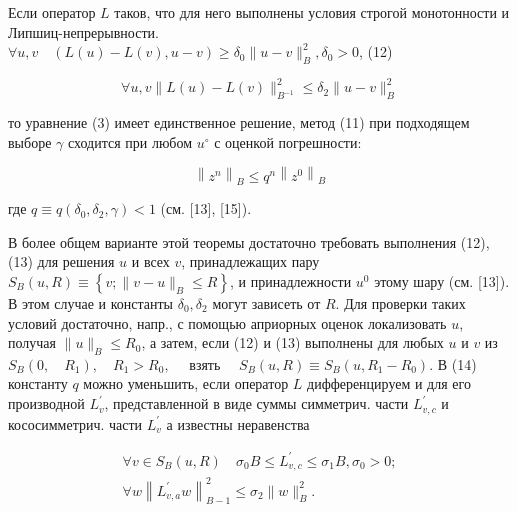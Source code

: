 \documentclass[10pt]{article}
\begin{document}
Если оператор $L$ таков, что для него выполнены условия строгой монотонности и Липшиц-непрерывности. $\forall u, v \quad(L(u)-L(v), u-v) \geqslant \delta_{0}\|u-v\|_{B}^{2}, \delta_{0}>0$, (12)



\[

\forall u, v\|L(u)-L(v)\|_{B^{-1}}^{2} \leqslant \delta_{2}\|u-v\|_{B}^{2}

\]



то уравнение (3) имеет единственное решение, метод (11) при подходящем выборе $\gamma$ сходится при любом $u^{\circ}$ с оценкой погрешности:



\[

\left\|z^{n}\right\|_{B} \leqslant q^{n}\left\|z^{0}\right\|_{B}

\]



где $q \equiv q\left(\delta_{0}, \delta_{2}, \gamma\right)<1$ (см. [13], [15]).



В более общем варианте этой теоремы достаточно требовать выполнения (12), (13) для решения $u$ и всех $v$, принадлежащих пару $S_{B}(u, R) \equiv\left\{v ;\|v-u\|_{B} \leqslant R\right\}$, и принадлежности $u^{0}$ этому шару (см. [13]). В этом случае и константы $\delta_{0}, \delta_{2}$ могут зависеть от $R$. Для проверки таких условий достаточно, напр., с помощью априорных оценок локализовать $u$, получая $\|u\|_{B} \leqslant R_{0}$, а затем, если (12) и (13) выполнены для любых $u$ и $v$ из $S_{B}\left(0, \quad R_{1}\right), \quad R_{1}>R_{0}, \quad$ взять $\quad S_{B}(u, R) \equiv S_{B}\left(u, R_{1}-R_{0}\right)$. В (14) константу $q$ можно уменьшить, если оператор $L$ дифференцируем и для его производной $L_{v}^{\prime}$, представленной в виде суммы симметрич. части $L_{v, c}^{\prime}$ и кососимметрич. части $L_{v}^{\prime}$ а известны неравенства



\[

\begin{gathered}

\forall v \in S_{B}(u, R) \quad \sigma_{0} B \leqslant L_{v, c}^{\prime} \leqslant \sigma_{1} B, \sigma_{0}>0 ; \\

\forall w\left\|L_{v, a}^{\prime} w\right\|_{B-1}^{2} \leqslant \sigma_{2}\|w\|_{B}^{2} .

\end{gathered}

\]
\end{document}
